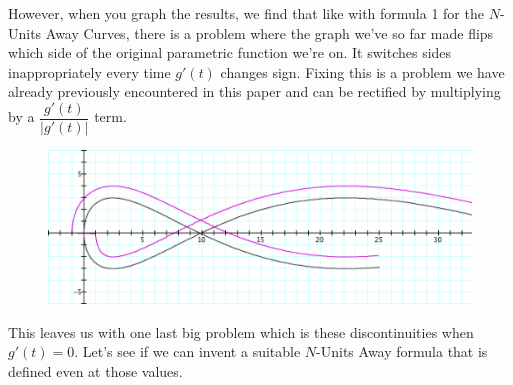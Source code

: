 However, when you graph the results, we find that like with formula 1 for the $N$-Units Away Curves, there is a problem where the graph we've so far made flips which side of the original parametric function we're on. It
switches sides inappropriately every time $g'(t)$ changes sign. Fixing this is a problem we have already previously encountered in this paper and can be rectified by multiplying by a $\dfrac{g'(t)}{|g'(t)|}$ term.

\begin{figure}[h!]
  \begin{minipage}[b]{\linewidth}
      \centering
      \includegraphics[width=\linewidth]{parametric-polar-img/Fig 29.png}
      \caption{}
      \label{fig:fig29}
  \end{minipage}
\end{figure}

This leaves us with one last big problem which is these discontinuities when $g'(t) = 0$. Let's see if we can invent a suitable $N$-Units Away formula that is defined even at those values.


